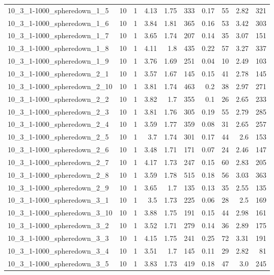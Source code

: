 \begin{center}
\begin{scriptsize}
\begin{longtable}{lrrrrrrrrr}
10\_3\_1-1000\_spheredown\_1\_5 & 10 & 1 & 4.13 & 1.75 & 333 & 0.17 & 55 & 2.82 & 321\\
10\_3\_1-1000\_spheredown\_1\_6 & 10 & 1 & 3.84 & 1.81 & 365 & 0.16 & 53 & 3.42 & 303\\
10\_3\_1-1000\_spheredown\_1\_7 & 10 & 1 & 3.65 & 1.74 & 207 & 0.14 & 35 & 3.07 & 151\\
10\_3\_1-1000\_spheredown\_1\_8 & 10 & 1 & 4.11 & 1.8 & 435 & 0.22 & 57 & 3.27 & 337\\
10\_3\_1-1000\_spheredown\_1\_9 & 10 & 1 & 3.76 & 1.69 & 251 & 0.04 & 10 & 2.49 & 103\\
10\_3\_1-1000\_spheredown\_2\_1 & 10 & 1 & 3.57 & 1.67 & 145 & 0.15 & 41 & 2.78 & 145\\
10\_3\_1-1000\_spheredown\_2\_10 & 10 & 1 & 3.81 & 1.74 & 463 & 0.2 & 38 & 2.97 & 271\\
10\_3\_1-1000\_spheredown\_2\_2 & 10 & 1 & 3.82 & 1.7 & 355 & 0.1 & 26 & 2.65 & 233\\
10\_3\_1-1000\_spheredown\_2\_3 & 10 & 1 & 3.81 & 1.76 & 305 & 0.19 & 55 & 2.79 & 285\\
10\_3\_1-1000\_spheredown\_2\_4 & 10 & 1 & 3.59 & 1.77 & 359 & 0.08 & 31 & 2.65 & 257\\
10\_3\_1-1000\_spheredown\_2\_5 & 10 & 1 & 3.7 & 1.74 & 301 & 0.17 & 44 & 2.6 & 153\\
10\_3\_1-1000\_spheredown\_2\_6 & 10 & 1 & 3.48 & 1.71 & 171 & 0.07 & 24 & 2.46 & 147\\
10\_3\_1-1000\_spheredown\_2\_7 & 10 & 1 & 4.17 & 1.73 & 247 & 0.15 & 60 & 2.83 & 205\\
10\_3\_1-1000\_spheredown\_2\_8 & 10 & 1 & 3.59 & 1.78 & 515 & 0.18 & 56 & 3.03 & 363\\
10\_3\_1-1000\_spheredown\_2\_9 & 10 & 1 & 3.65 & 1.7 & 135 & 0.13 & 35 & 2.55 & 135\\
10\_3\_1-1000\_spheredown\_3\_1 & 10 & 1 & 3.5 & 1.73 & 225 & 0.06 & 28 & 2.5 & 169\\
10\_3\_1-1000\_spheredown\_3\_10 & 10 & 1 & 3.88 & 1.75 & 191 & 0.15 & 44 & 2.98 & 161\\
10\_3\_1-1000\_spheredown\_3\_2 & 10 & 1 & 3.52 & 1.71 & 279 & 0.14 & 36 & 2.89 & 175\\
10\_3\_1-1000\_spheredown\_3\_3 & 10 & 1 & 4.15 & 1.75 & 241 & 0.25 & 72 & 3.31 & 191\\
10\_3\_1-1000\_spheredown\_3\_4 & 10 & 1 & 3.51 & 1.7 & 145 & 0.11 & 29 & 2.82 & 81\\
10\_3\_1-1000\_spheredown\_3\_5 & 10 & 1 & 3.83 & 1.73 & 419 & 0.18 & 47 & 3.0 & 245\\

\end{longtable}
\end{scriptsize}
\end{center}
